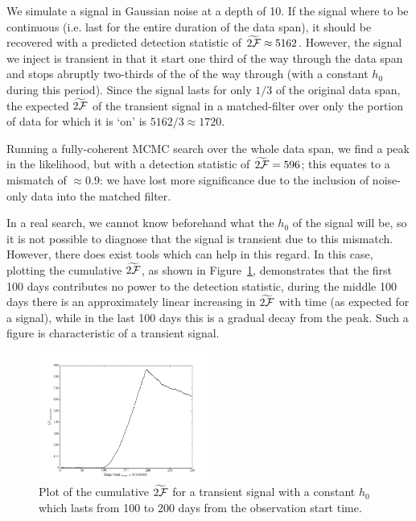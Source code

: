 \documentclass[aps, prd, twocolumn, superscriptaddress, floatfix, showpacs, nofootinbib, longbibliography]{revtex4-1}
\begin{document}
We simulate a signal in Gaussian noise at a depth of 10. If the signal where to
be continuous (i.e. last for the entire duration of the data span), it should
be recovered with a predicted detection statistic of
$\widetilde{2{\mathcal{F}}}\approx5162$. However, the signal we inject is transient in
that it start one third of the way through the data span and stops abruptly
two-thirds of the of the way through (with a constant $h_0$ during this
period). Since the signal lasts for only $1/3$ of the original data span, the
expected $\widetilde{2{\mathcal{F}}}$ of the transient signal in a matched-filter over only
the portion of data for which it is `on' is $5162/3\approx1720$.

Running a fully-coherent MCMC search over the whole data span, we find a peak
in the likelihood, but with a detection statistic of $\widetilde{2{\mathcal{F}}}=596$;
this equates to a mismatch of $\approx0.9$: we have lost more significance due
to the inclusion of noise-only data into the matched filter.

In a real search, we cannot know beforehand what the $h_0$ of the signal will
be, so it is not possible to diagnose that the signal is transient due to this
mismatch. However, there does exist tools which can help in this regard. In
this case, plotting the cumulative $\widetilde{2{\mathcal{F}}}$, as shown in
Figure~\ref{fig_transient_cumulative_twoF}, demonstrates that the first 100
days contributes no power to the detection statistic, during the middle 100
days there is an approximately linear increasing in $\widetilde{2{\mathcal{F}}}$ with time
(as expected for a signal), while in the last 100 days this is a gradual decay
from the peak. Such a figure is characteristic of a transient signal.
\begin{figure}[htb]
\centering
\includegraphics[width=0.5\textwidth]{transient_search_initial_stage_twoFcumulative}
\caption{Plot of the cumulative $\widetilde{2{\mathcal{F}}}$ for a transient signal with a
constant $h_0$ which lasts from 100 to 200 days from the observation start
time.}
\label{fig_transient_cumulative_twoF}
\end{figure}
\end{document}
